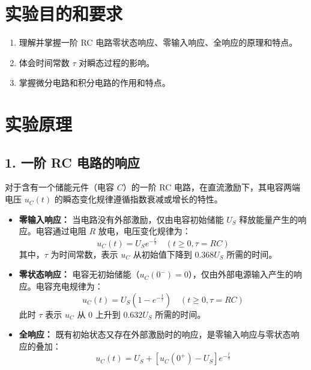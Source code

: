 ﻿\documentclass[10.5pt]{config}
\date{}
\begin{document}
\makeheader %

\section{实验目的和要求}

\begin{enumerate}[label=\arabic*., leftmargin=2em]
    \item 理解并掌握一阶 RC 电路零状态响应、零输入响应、全响应的原理和特点。
    \item 体会时间常数 $\tau$ 对瞬态过程的影响。
    \item 掌握微分电路和积分电路的作用和特点。
\end{enumerate}

\section{实验原理}

\subsection*{1. 一阶 RC 电路的响应}

对于含有一个储能元件（电容 $C$）的一阶 RC 电路，在直流激励下，其电容两端电压 $u_C(t)$ 的瞬态变化规律遵循指数衰减或增长的特性。
\begin{itemize}[leftmargin=2em]
    \item \textbf{零输入响应：} 当电路没有外部激励，仅由电容初始储能 $U_S$ 释放能量产生的响应。电容通过电阻 $R$ 放电，电压变化规律为：
    \begin{equation*}
        u_C(t) = U_S e^{-\frac{t}{\tau}} \quad (t \ge 0, \tau = RC)
    \end{equation*}
    其中，$\tau$ 为时间常数，表示 $u_C$ 从初始值下降到 $0.368U_S$ 所需的时间。
    
    \item \textbf{零状态响应：} 电容无初始储能（$u_C(0^-)=0$），仅由外部电源输入产生的响应。电容充电规律为：
    \begin{equation*}
        u_C(t) = U_S \left(1 - e^{-\frac{t}{\tau}}\right) \quad (t \ge 0, \tau = RC)
    \end{equation*}
    此时 $\tau$ 表示 $u_C$ 从 $0$ 上升到 $0.632U_S$ 所需的时间。

    \item \textbf{全响应：} 既有初始状态又存在外部激励时的响应，是零输入响应与零状态响应的叠加：
    \begin{equation*}
        u_C(t) = U_S + \left[u_C(0^+) - U_S\right] e^{-\frac{t}{\tau}}
    \end{equation*}
\end{itemize}
\end{document}
